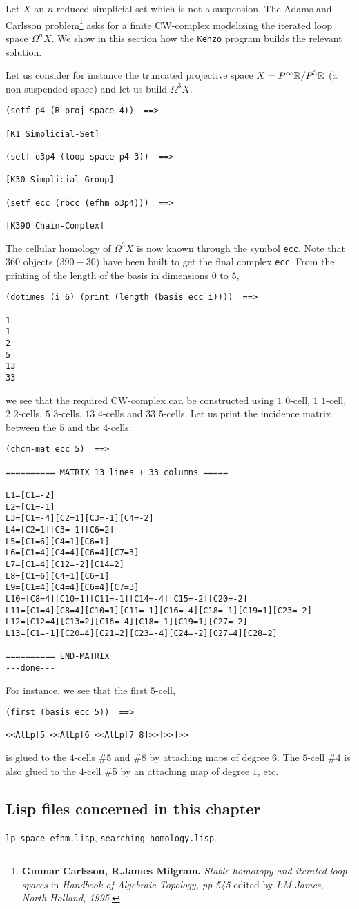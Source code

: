 Let $X$ an $n$-reduced simplicial set which is not a suspension.
The Adams and Carlsson
problem\footnote{{\bf Gunnar Carlsson, R.James Milgram.} {\em Stable homotopy and iterated loop spaces}  in
{\em Handbook of Algebraic Topology, pp 545} edited by {\em I.M.James, North-Holland, 1995}.}
asks for a finite CW-complex modelizing the iterated loop space $\Omega^n X$. We show in this section
how the {\tt Kenzo} program builds the relevant solution.\par
Let us consider for instance the truncated projective space $X=P^\infty {{\mathbb{R}}}/ P^3 {{\mathbb{R}}}$ (a non-suspended space)
and let us build $\Omega^3 X$.
{\footnotesize\begin{verbatim}
(setf p4 (R-proj-space 4))  ==>

[K1 Simplicial-Set]

(setf o3p4 (loop-space p4 3))  ==>

[K30 Simplicial-Group]

(setf ecc (rbcc (efhm o3p4)))  ==>

[K390 Chain-Complex]
\end{verbatim}}
The cellular homology of $\Omega^3 X$ is now known through the symbol {\tt ecc}. Note that $360$ objects
($390-30$) have been built to get the final complex {\tt ecc}. From the printing of the length of the
basis in dimensions $0$ to $5$,
{\footnotesize\begin{verbatim}
(dotimes (i 6) (print (length (basis ecc i))))  ==>

1
1
2
5
13
33
\end{verbatim}}
we see that the required CW-complex can be constructed using $1$ $0$-cell, $1$ $1$-cell, $2$ $2$-cells,
$5$ $3$-cells, $13$ $4$-cells and $33$ $5$-cells. Let us print the incidence matrix between
the $5$ and the $4$-cells:
\newpage
{\footnotesize\begin{verbatim}
(chcm-mat ecc 5)  ==>

========== MATRIX 13 lines + 33 columns =====

L1=[C1=-2]
L2=[C1=-1]
L3=[C1=-4][C2=1][C3=-1][C4=-2]
L4=[C2=1][C3=-1][C6=2]
L5=[C1=6][C4=1][C6=1]
L6=[C1=4][C4=4][C6=4][C7=3]
L7=[C1=4][C12=-2][C14=2]
L8=[C1=6][C4=1][C6=1]
L9=[C1=4][C4=4][C6=4][C7=3]
L10=[C8=4][C10=1][C11=-1][C14=-4][C15=-2][C20=-2]
L11=[C1=4][C8=4][C10=1][C11=-1][C16=-4][C18=-1][C19=1][C23=-2]
L12=[C12=4][C13=2][C16=-4][C18=-1][C19=1][C27=-2]
L13=[C1=-1][C20=4][C21=2][C23=-4][C24=-2][C27=4][C28=2]

========== END-MATRIX
---done---
\end{verbatim}}
For instance, we see that the first $5$-cell,
{\footnotesize\begin{verbatim}
(first (basis ecc 5))  ==>

<<AlLp[5 <<AlLp[6 <<AlLp[7 8]>>]>>]>>
\end{verbatim}}
is glued to the $4$-cells \#5 and \#8 by attaching  maps of degree $6$.
The $5$-cell \#4 is also glued to the $4$-cell \#5 by an attaching map
of degree $1$, etc.

\subsection* {Lisp files concerned in this chapter}

{\tt lp-space-efhm.lisp}, {\tt searching-homology.lisp}.
